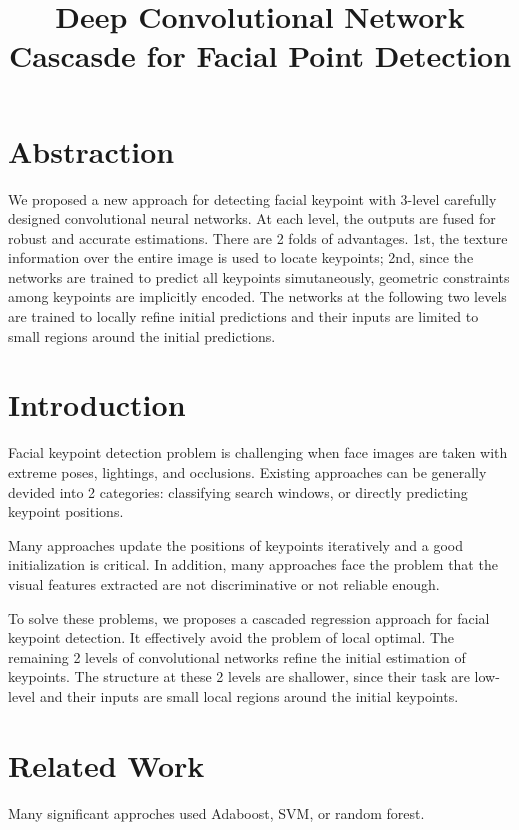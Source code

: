 

\title{Deep Convolutional Network Cascasde for Facial Point Detection}
\maketitle

\section{Abstraction}
We proposed a new approach for detecting facial keypoint with 3-level carefully designed
convolutional neural networks. At each level, the outputs are fused for robust and accurate
estimations. There are 2 folds of advantages. 1st, the texture information over the entire
image is used to locate keypoints; 2nd, since the networks are trained to predict all keypoints
simutaneously, geometric constraints among keypoints are implicitly encoded.
The networks at the following two levels are trained to locally refine initial predictions and
their inputs are limited to small regions around the initial predictions.

\section{Introduction}
Facial keypoint detection problem is challenging when face images are taken with extreme poses,
lightings, and occlusions. Existing approaches can be generally devided into 2 categories:
classifying search windows, or directly predicting keypoint positions.

Many approaches update the positions of keypoints iteratively and a good initialization is
critical. In addition, many approaches face the problem that the visual features extracted are
not discriminative or not reliable enough.

To solve these problems, we proposes a cascaded regression approach for facial keypoint detection.
It effectively avoid the problem of local optimal. The remaining 2 levels of convolutional networks
refine the initial estimation of keypoints. The structure at these 2 levels are shallower, since
their task are low-level and their inputs are small local regions around the initial keypoints.

\section{Related Work}
Many significant approches used Adaboost, SVM, or random forest.

